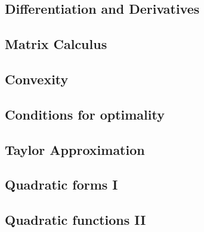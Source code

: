 \subsection{Differentiation and Derivatives}


\subsection{Matrix Calculus}


\subsection{Convexity}


\subsection{Conditions for optimality}


\subsection{Taylor Approximation}


\subsection{Quadratic forms I}


\subsection{Quadratic functions II}


